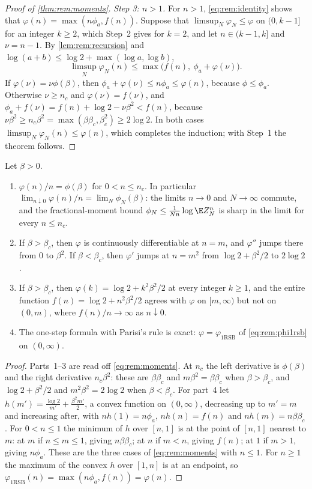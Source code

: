 \begin{refsection}
\begin{proof}[Proof of \cref{thm:rem:moments}]
\emph{Step 3: $n>1$.} For $n>1$, \eqref{eq:rem:identity} shows that $\varphi(n)=\max(n\phi_a,f(n))$. Suppose that $\limsup_N\varphi_N\le\varphi$ on $(0,k-1]$ for an integer $k\ge2$, which Step~2 gives for $k=2$, and let $n\in(k-1,k]$ and $\nu=n-1$. By \cref{lem:rem:recursion} and $\log(a+b)\le\log2+\max(\log a,\log b)$,
\[
\limsup_N\varphi_N(n)\le\max\bigl(f(n),\ \phi_a+\varphi(\nu)\bigr).
\]
If $\varphi(\nu)=\nu\phi(\beta)$, then $\phi_a+\varphi(\nu)\le n\phi_a\le\varphi(n)$, because $\phi\le\phi_a$. Otherwise $\nu\ge n_c$ and $\varphi(\nu)=f(\nu)$, and $\phi_a+f(\nu)=f(n)+\log2-\nu\beta^2<f(n)$, because $\nu\beta^2\ge n_c\beta^2=\max(\beta\beta_c,\beta_c^2)\ge2\log2$. In both cases $\limsup_N\varphi_N(n)\le\varphi(n)$, which completes the induction; with Step~1 the theorem follows.
\end{proof}

\begin{corollary}\label{cor:rem:replicas}
Let $\beta>0$.
\begin{enumerate}
\item $\varphi(n)/n=\phi(\beta)$ for $0<n\le n_c$. In particular $\lim_{n\downarrow0}\varphi(n)/n=\lim_N\phi_N(\beta)$: the limits $n\to0$ and $N\to\infty$ commute, and the fractional-moment bound $\phi_N\le\frac1{Nn}\log\E Z_N^n$ is sharp in the limit for every $n\le n_c$.
\item If $\beta>\beta_c$, then $\varphi$ is continuously differentiable at $n=m$, and $\varphi''$ jumps there from $0$ to $\beta^2$. If $\beta<\beta_c$, then $\varphi'$ jumps at $n=m^2$ from $\log2+\beta^2/2$ to $2\log2$.
\item If $\beta>\beta_c$, then $\varphi(k)=\log2+k^2\beta^2/2$ at every integer $k\ge1$, and the entire function $f(n)=\log2+n^2\beta^2/2$ agrees with $\varphi$ on $[m,\infty)$ but not on $(0,m)$, where $f(n)/n\to\infty$ as $n\downarrow0$.
\item The one-step formula with Parisi's rule is exact: $\varphi=\varphi_{\mathrm{1RSB}}$ of \eqref{eq:rem:phi1rsb} on $(0,\infty)$.
\end{enumerate}
\end{corollary}

\begin{proof}
Parts~1--3 are read off \eqref{eq:rem:moments}. At $n_c$ the left derivative is $\phi(\beta)$ and the right derivative $n_c\beta^2$: these are $\beta\beta_c$ and $m\beta^2=\beta\beta_c$ when $\beta>\beta_c$, and $\log2+\beta^2/2$ and $m^2\beta^2=2\log2$ when $\beta<\beta_c$. For part~4 let $h(m')=\frac{\log2}{m'}+\frac{\beta^2m'}2$, a convex function on $(0,\infty)$, decreasing up to $m'=m$ and increasing after, with $nh(1)=n\phi_a$, $nh(n)=f(n)$ and $nh(m)=n\beta\beta_c$. For $0<n\le1$ the minimum of $h$ over $[n,1]$ is at the point of $[n,1]$ nearest to $m$: at $m$ if $n\le m\le1$, giving $n\beta\beta_c$; at $n$ if $m<n$, giving $f(n)$; at $1$ if $m>1$, giving $n\phi_a$. These are the three cases of \eqref{eq:rem:moments} with $n\le1$. For $n\ge1$ the maximum of the convex $h$ over $[1,n]$ is at an endpoint, so $\varphi_{\mathrm{1RSB}}(n)=\max(n\phi_a,f(n))=\varphi(n)$.
\end{proof}


\end{refsection}
